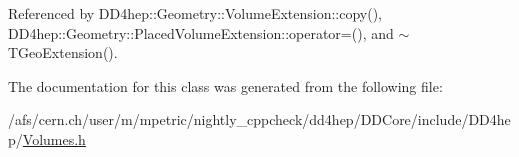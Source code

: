 Referenced by D\+D4hep\+::\+Geometry\+::\+Volume\+Extension\+::copy(), D\+D4hep\+::\+Geometry\+::\+Placed\+Volume\+Extension\+::operator=(), and $\sim$\+T\+Geo\+Extension().



The documentation for this class was generated from the following file\+:\begin{DoxyCompactItemize}
\item 
/afs/cern.\+ch/user/m/mpetric/nightly\+\_\+cppcheck/dd4hep/\+D\+D\+Core/include/\+D\+D4hep/\hyperlink{_volumes_8h}{Volumes.\+h}\end{DoxyCompactItemize}
